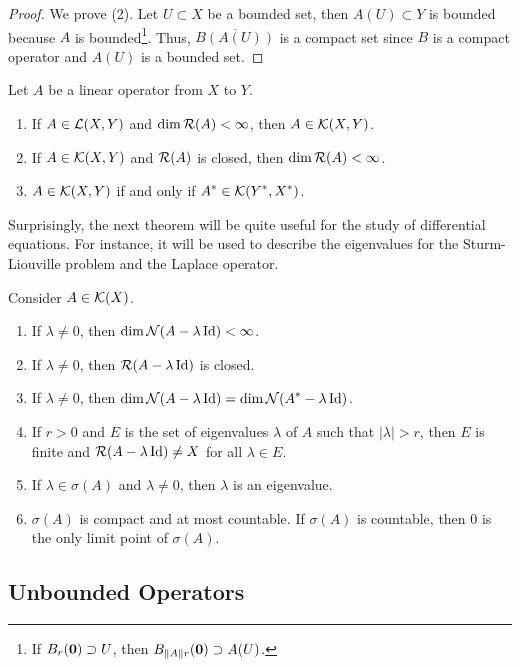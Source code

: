 \begin{proof}
We prove (2).  Let $U\subset X$ be a bounded set, then
$A(U) \subset Y$ is bounded because $A$ is bounded\footnote{If
$B_r({\bm{0}}) \supset U$, then $B_{\|A\|r}({\bm{0}}) \supset A(U)$.}.
Thus, $\overline{B(A(U))}$ is a compact set since $B$ is a compact
operator and $A(U)$ is a bounded set.
\end{proof}

\begin{theorem} \label{fa_finit_compact}
Let $A$ be a linear operator from $X$ to $Y$.
\begin{enumerate}
\item If $A \in \mathcal{L}(X,Y)$ and $\dim \mathcal{R}(A) < \infty$, then $A \in \mathcal{K}(X,Y)$.
\item If $A \in \mathcal{K}(X,Y)$ and $\mathcal{R}(A)$ is closed, then
$\dim \mathcal{R}(A) < \infty$.
\item $A \in \mathcal{K}(X,Y)$ if and only if
$\displaystyle A^\ast \in \mathcal{K}(Y^\ast, X^\ast)$.
\end{enumerate}
\end{theorem}

Surprisingly, the next theorem will be quite useful for the study of
differential equations.  For instance, it will be used to describe the
eigenvalues for the Sturm-Liouville problem and the Laplace operator.

\begin{theorem} \label{fu_an_comp_oper}
Consider $A \in \mathcal{K}(X)$.
\begin{enumerate}
\item If $\lambda \neq 0$, then $\dim \mathcal{N}(A-\lambda \operatorname{Id}) < \infty$.
\item If $\lambda \neq 0$, then $\mathcal{R}(A-\lambda \operatorname{Id})$ is closed.
\item If $\lambda \neq 0$, then
$\displaystyle \dim \mathcal{N}(A-\lambda \operatorname{Id}) = \dim \mathcal{N}(A^\ast-\lambda \operatorname{Id})$.
\item If $r>0$ and $E$ is the set of eigenvalues $\lambda$ of $A$ such
that $|\lambda|>r$, then $E$ is finite and $\mathcal{R}(A-\lambda \operatorname{Id}) \neq X$
for all $\lambda \in E$.
\item If $\lambda \in \sigma(A)$ and $\lambda \neq 0$, then $\lambda$
is an eigenvalue.
\item $\sigma(A)$ is compact and at most countable.  If $\sigma(A)$ is
countable, then $0$ is the only limit point of $\sigma(A)$.
\end{enumerate}
\end{theorem}

\subsection{Unbounded Operators}

